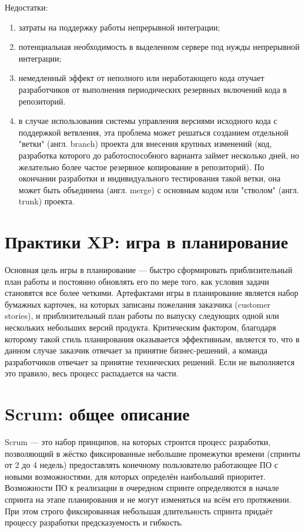\documentclass{article}
\begin{document}
    Недостатки:
    \begin{enumerate}
        \item затраты на поддержку работы непрерывной интеграции;
        \item потенциальная необходимость в выделенном сервере под нужды непрерывной интеграции;
        \item немедленный эффект от неполного или неработающего кода отучает разработчиков от выполнения периодических резервных включений кода в репозиторий.
        \item в случае использования системы управления версиями исходного кода с поддержкой ветвления, эта проблема может решаться созданием отдельной "ветки" (англ. branch) проекта для внесения крупных изменений (код, разработка которого до работоспособного варианта займет несколько дней, но желательно более частое резервное копирование в репозиторий). По окончании разработки и индивидуального тестирования такой ветки, она может быть объединена (англ. merge) с основным кодом или "стволом" (англ. trunk) проекта.
    \end{enumerate}

\section{Практики XP: игра в планирование}
    Основная цель игры в планирование — быстро сформировать приблизительный план работы и постоянно обновлять его по мере того, как условия задачи становятся все более четкими. Артефактами игры в планирование является набор бумажных карточек, на которых записаны пожелания заказчика (customer stories), и приблизительный план работы по выпуску следующих одной или нескольких небольших версий продукта. Критическим фактором, благодаря которому такой стиль планирования оказывается эффективным, является то, что в данном случае заказчик отвечает за принятие бизнес-решений, а команда разработчиков отвечает за принятие технических решений. Если не выполняется это правило, весь процесс распадается на части.

\section{Scrum: общее описание}
    Scrum — это набор принципов, на которых строится процесс разработки, позволяющий в жёстко фиксированные небольшие промежутки времени (спринты от 2 до 4 недель) предоставлять конечному пользователю работающее ПО с новыми возможностями, для которых определён наибольший приоритет. Возможности ПО к реализации в очередном спринте определяются в начале спринта на этапе планирования и не могут изменяться на всём его протяжении. При этом строго фиксированная небольшая длительность спринта придаёт процессу разработки предсказуемость и гибкость.
\end{document}
